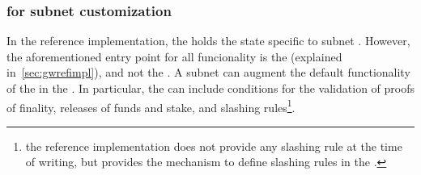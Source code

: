\subsubsection{\sa for subnet customization}
\label{sec:refimplsa} In the reference implementation, the  holds the state specific to subnet . However, the aforementioned entry point for all funcionality is the \gw (explained in~\cref{sec:gwrefimpl}), and not the \sa. A subnet can augment the default functionality of the \gw in the \sa. In particular, the \sa can include conditions for the validation of proofs of finality, releases of funds and stake, and slashing rules\footnote{the reference implementation does not provide any slashing rule at the time of writing, but provides the mechanism to define slashing rules in the \sa.}.


